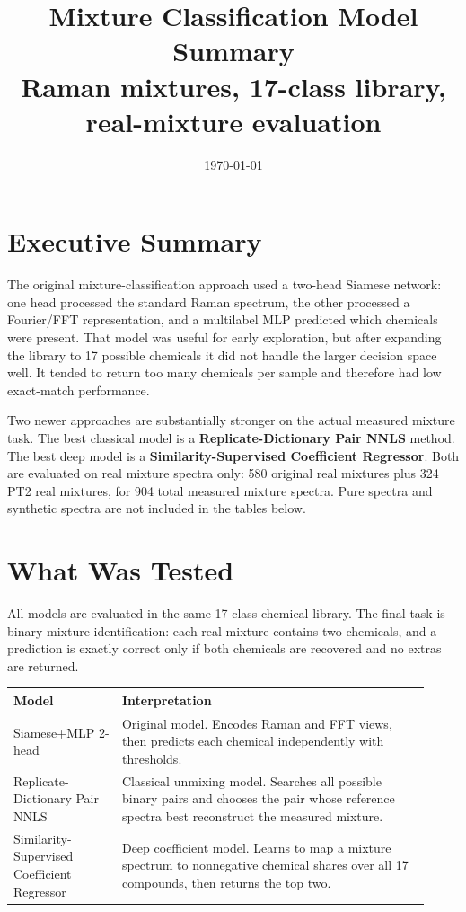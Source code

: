 \documentclass[11pt]{article}
\title{\textbf{Mixture Classification Model Summary}\\
\large Raman mixtures, 17-class library, real-mixture evaluation}
\author{}
\date{\today}
\begin{document}
\maketitle

\section*{Executive Summary}

The original mixture-classification approach used a two-head Siamese network: one head processed the standard Raman spectrum, the other processed a Fourier/FFT representation, and a multilabel MLP predicted which chemicals were present. That model was useful for early exploration, but after expanding the library to 17 possible chemicals it did not handle the larger decision space well. It tended to return too many chemicals per sample and therefore had low exact-match performance.

Two newer approaches are substantially stronger on the actual measured mixture task. The best classical model is a \textbf{Replicate-Dictionary Pair NNLS} method. The best deep model is a \textbf{Similarity-Supervised Coefficient Regressor}. Both are evaluated on real mixture spectra only: 580 original real mixtures plus 324 PT2 real mixtures, for 904 total measured mixture spectra. Pure spectra and synthetic spectra are not included in the tables below.

\section*{What Was Tested}

All models are evaluated in the same 17-class chemical library. The final task is binary mixture identification: each real mixture contains two chemicals, and a prediction is exactly correct only if both chemicals are recovered and no extras are returned.

\begin{center}
\begin{tabular}{p{0.24\linewidth}p{0.68\linewidth}}
\toprule
\textbf{Model} & \textbf{Interpretation} \\
\midrule
Siamese+MLP 2-head & Original model. Encodes Raman and FFT views, then predicts each chemical independently with thresholds. \\
Replicate-Dictionary Pair NNLS & Classical unmixing model. Searches all possible binary pairs and chooses the pair whose reference spectra best reconstruct the measured mixture. \\
Similarity-Supervised Coefficient Regressor & Deep coefficient model. Learns to map a mixture spectrum to nonnegative chemical shares over all 17 compounds, then returns the top two. \\
\bottomrule
\end{tabular}
\end{center}
\end{document}
